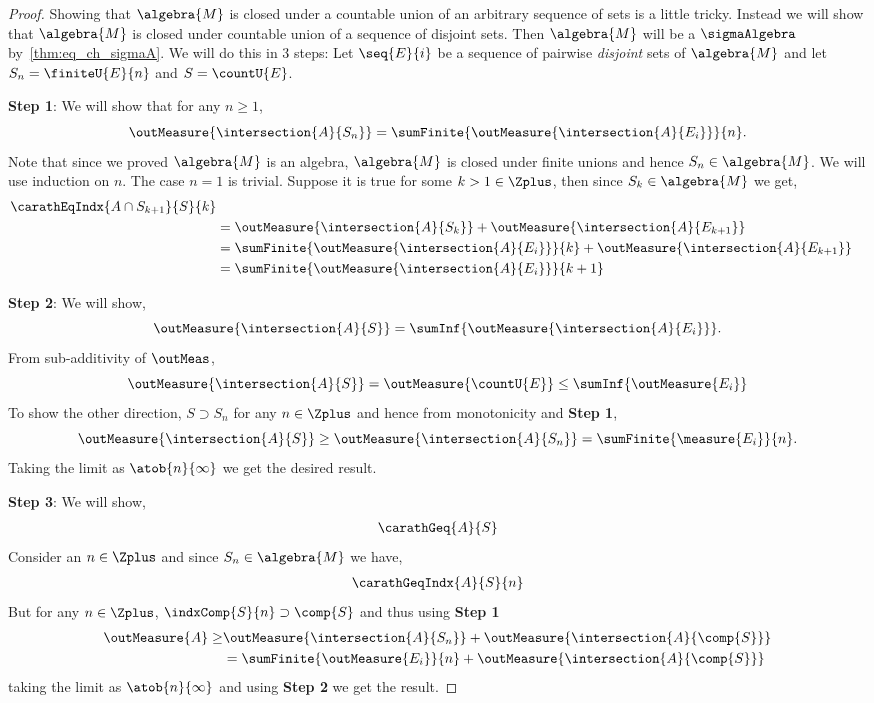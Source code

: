 \begin{proof}
    Showing that $\algebra{M}$ is closed under a countable union of an arbitrary sequence of sets is
    a little tricky. Instead we will show that $\algebra{M}$ is closed under countable union of a
    sequence of disjoint sets. Then $\algebra{M}$ will be a $\sigmaAlgebra$
    by~\ref{thm:eq_ch_sigmaA}. We will do this in 3 steps:
    Let $\seq{E}{i}$ be a sequence of pairwise \emph{disjoint} sets of $\algebra{M}$ and let
    $S_n = \finiteU{E}{n}$ and $S = \countU{E}$.
    
    \textbf{\large{Step 1}}:
    We will show that for any $n \geq 1$,
    \[\outMeasure{\intersection{A}{S_n}} = \sumFinite{\outMeasure{\intersection{A}{E_i}}}{n}.\]
    Note that since we proved $\algebra{M}$ is an algebra, $\algebra{M}$ is closed under finite
    unions and hence $S_n \in \algebra{M}$. We will use induction on $n$. The case $n=1$ is trivial.
    Suppose it is true for some $k > 1 \in \Zplus$, then since $S_{k} \in \algebra{M}$ we get, 
    \begin{align*}
	\carathEqIndx{A\cap S_{k+1}}{S}{k} \\
	&= \outMeasure{\intersection{A}{S_k}} + \outMeasure{\intersection{A}{E_{k+1}}} \\
	&= \sumFinite{\outMeasure{\intersection{A}{E_i}}}{k} + \outMeasure{\intersection{A}{E_{k+1}}} \\	
	&= \sumFinite{\outMeasure{\intersection{A}{E_i}}}{k+1}
    \end{align*}

    \textbf{\large{Step 2}}:
    We will show,
    \[\outMeasure{\intersection{A}{S}} = \sumInf{\outMeasure{\intersection{A}{E_i}}}.\]
    From sub-additivity of $\outMeas$,
    \[\outMeasure{\intersection{A}{S}} = \outMeasure{\countU{E}} \leq \sumInf{\outMeasure{E_i}}\] 
    To show the other direction,
    $S \supset S_n$ for any $n \in \Zplus$ and hence from monotonicity and \textbf{\large{Step 1}},
    \[\outMeasure{\intersection{A}{S}} \geq \outMeasure{\intersection{A}{S_n}} =
	\sumFinite{\measure{E_i}}{n}.\]
    Taking the limit as $\atob{n}{\infty}$ we get the desired result.

    \textbf{\large{Step 3}}:
    We will show,
    \begin{align*} \carathGeq{A}{S} \end{align*}
    Consider an $n \in \Zplus$ and since $S_n \in \algebra{M}$ we have,
    \begin{align*} \carathGeqIndx{A}{S}{n} \end{align*}
    But for any $n \in \Zplus$, $\indxComp{S}{n} \supset \comp{S}$ and thus using
    \textbf{\large{Step 1}} 
    \begin{align*}
	\outMeasure{A} \geq &\outMeasure{\intersection{A}{S_n}} + 
	\outMeasure{\intersection{A}{\comp{S}}} \\
	& = \sumFinite{\outMeasure{E_i}}{n} + \outMeasure{\intersection{A}{\comp{S}}}
    \end{align*}
    taking the limit as $\atob{n}{\infty}$ and using \textbf{\large{Step 2}} we get the result.
    


\end{proof}

